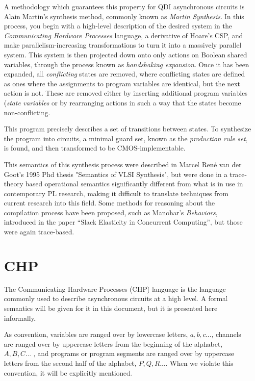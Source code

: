 \documentclass[times, 10pt]{article}
\begin{document}
A methodology which guarantees this property for QDI asynchronous circuits is
Alain Martin's synthesis method, commonly known as {\it Martin Synthesis}.  In
this process, you begin with a high-level description of the desired system in the
{\it Communicating Hardware Processes } language, a derivative of Hoare's CSP,
and make parallelism-increasing transformations to turn it into a massively
parallel system. This system is then projected down onto only actions on Boolean
shared variables, through the process known as {\it handshaking expansion}. Once
it has been expanded, all {\it conflicting} states are removed, where
conflicting states are defined as ones where the assignments to program
variables are identical, but the next action is not.  These are removed either
by inserting additional program variables ({\it state variables} or by
rearranging actions in such a way that the states become non-conflicting.

This program precisely describes a set of transitions between states.  To
synthesize the program into circuits, a minimal guard set, known as the
{\it production rule set}, is found, and then transformed to be
CMOS-implementable. 

This semantics of this synthesis process were described in Marcel Ren\'{e} van der
Goot's 1995 Phd thesis "Semantics of VLSI Synthesis", but were done in a
trace-theory based operational semantics significantly different from what is in
use in contemporary PL research, making it difficult to translate techniques
from current research into this field. Some methods for reasoning about the
compilation process have been proposed, such as Manohar's {\it Behaviors},
introduced in the paper ``Slack Elasticity in Concurrent Computing'', but those
were again trace-based.

\section{CHP}

The Communicating Hardware Processes (CHP) language is the language commonly
used to describe asynchronous circuits at a high level.  A formal semantics will
be given for it in this document, but it is presented here informally.

As convention, variables are ranged over by lowercase letters, $a, b, c \ldots$,
channels are ranged over by uppercase letters from the beginning of the
alphabet, $A, B, C \ldots$ ,  and programs or program segments are ranged over
by uppercase letters from the second half of the alphabet, $P, Q, R \ldots$.
When we violate this convention, it will be explicitly mentioned.
\end{document}
